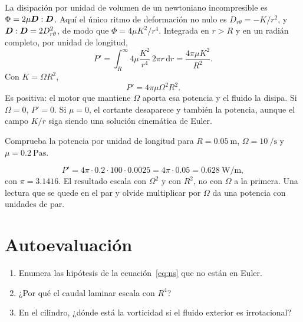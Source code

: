 La disipación por unidad de volumen de un newtoniano incompresible es \(\Phi=2\mu\boldsymbol{D}:\boldsymbol{D}\). Aquí el único ritmo de deformación no nulo es \(D_{r\theta}=-K/r^2\), y \(\boldsymbol{D}:\boldsymbol{D}=2D_{r\theta}^2\), de modo que \(\Phi=4\mu K^2/r^4\). Integrada en \(r>R\) y en un radián completo, por unidad de longitud,
\[
P'=\int_R^{\infty}4\mu\frac{K^2}{r^4}\,2\pi r\,\mathrm{d}r
=\frac{4\pi\mu K^2}{R^2}.
\]
Con \(K=\Omega R^2\),
\begin{equation}
\label{eq:potencia-cilindro}
P'=4\pi\mu\Omega^2 R^2.
\end{equation}
 Es positiva: el motor que mantiene \(\Omega\) aporta esa potencia y el fluido la disipa. Si \(\Omega=0\), \(P'=0\). Si \(\mu=0\), el cortante desaparece y también la potencia, aunque el campo \(K/r\) siga siendo una solución cinemática de Euler.

\begin{problembox}[Avanzado]
Comprueba la potencia por unidad de longitud para \(R=\qty{0.05}{\metre}\), \(\Omega=\qty{10}{\per\second}\) y \(\mu=\qty{0.2}{\pascal\second}\).
\end{problembox}
\begin{solutionbox}
\[
P'=4\pi\cdot 0.2\cdot 100\cdot 0.0025
=4\pi\cdot 0.05
=\qty{0.628}{\watt\per\metre},
\]
con \(\pi=3.1416\). El resultado escala con \(\Omega^2\) y con \(R^2\), no con \(\Omega\) a la primera. Una lectura que se quede en el par y olvide multiplicar por \(\Omega\) da una potencia con unidades de par.
\end{solutionbox}

\section{Autoevaluación}
\begin{enumerate}[leftmargin=1.4em]
\item Enumera las hipótesis de la ecuación~\eqref{eq:ns} que no están en Euler.
\item ¿Por qué el caudal laminar escala con \(R^4\)?
\item En el cilindro, ¿dónde está la vorticidad si el fluido exterior es irrotacional?
\end{enumerate}
